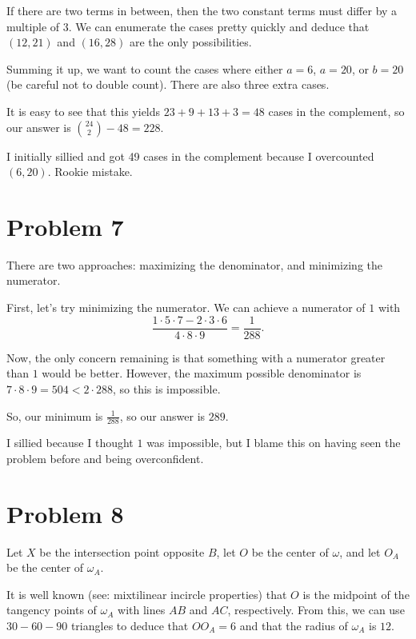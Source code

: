 \documentclass{scrartcl}
\begin{document}
If there are two terms in between, then the two constant terms must differ
by a multiple of $3$.
We can enumerate the cases pretty quickly and deduce that $(12,21)$ and $(16,28)$
are the only possibilities.

Summing it up, we want to count the cases
where either $a=6$, $a=20$, or $b=20$ (be careful not to double count).
There are also three extra cases.

It is easy to see that this yields $23 + 9 + 13 + 3 = 48$ cases in the complement,
so our answer is $\binom{24}{2} - 48 = \boxed{228}$.

\begin{remark*}
I initially sillied and got 49 cases in the complement because I overcounted $(6,20)$.
Rookie mistake.
\end{remark*}

\section*{Problem 7}
There are two approaches: maximizing the denominator, and minimizing the numerator.

First, let's try minimizing the numerator.
We can achieve a numerator of $1$ with
\[ \frac{1 \cdot 5 \cdot 7 - 2 \cdot 3 \cdot 6}{4 \cdot 8 \cdot 9} = \frac{1}{288}. \]

Now, the only concern remaining is that something with a numerator greater than $1$ would be better.
However, the maximum possible denominator is $7 \cdot 8 \cdot 9 = 504 < 2 \cdot 288$, so this is
impossible.

So, our minimum is $\frac{1}{288}$, so our answer is $\boxed{289}$.

\begin{remark*}
I sillied because I thought $1$ was impossible,
but I blame this on having seen the problem before and being overconfident.
\end{remark*}

\section*{Problem 8}
Let $X$ be the intersection point opposite $B$,
let $O$ be the center of $\omega$,
and let $O_A$ be the center of $\omega_A$.

It is well known (see: mixtilinear incircle properties)
that $O$ is the midpoint of the tangency points of
$\omega_A$ with lines $AB$ and $AC$, respectively.
From this, we can use $30-60-90$ triangles to deduce
that $OO_A = 6$ and that the radius of $\omega_A$ is $12$.
\end{document}
